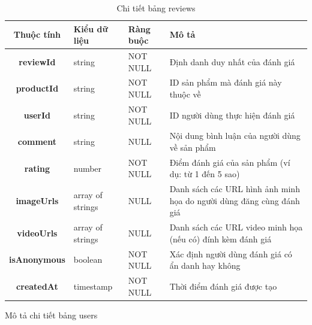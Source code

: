 \documentclass[../DoAn.tex]{subfiles}
\begin{document}
\begin{table}[H]
\centering
\begin{tabular}{|c|l|l|p{7cm}|}
\hline
\textbf{Thuộc tính} & \textbf{Kiểu dữ liệu} & \textbf{Ràng buộc} & \textbf{Mô tả} \\ \hline
\textbf{reviewId} & string & NOT NULL & Định danh duy nhất của đánh giá \\ \hline
\textbf{productId} & string & NOT NULL & ID sản phẩm mà đánh giá này thuộc về \\ \hline
\textbf{userId} & string & NOT NULL & ID người dùng thực hiện đánh giá \\ \hline
\textbf{comment} & string & NULL & Nội dung bình luận của người dùng về sản phẩm \\ \hline
\textbf{rating} & number & NOT NULL & Điểm đánh giá của sản phẩm (ví dụ: từ 1 đến 5 sao) \\ \hline
\textbf{imageUrls} & array of strings & NULL & Danh sách các URL hình ảnh minh họa do người dùng đăng cùng đánh giá \\ \hline
\textbf{videoUrls} & array of strings & NULL & Danh sách các URL video minh họa (nếu có) đính kèm đánh giá \\ \hline
\textbf{isAnonymous} & boolean & NOT NULL & Xác định người dùng đánh giá có ẩn danh hay không \\ \hline
\textbf{createdAt} & timestamp & NOT NULL & Thời điểm đánh giá được tạo \\ \hline
\end{tabular}
\caption{Chi tiết bảng reviews}
\label{tab:reviewsTable}
\end{table}

Mô tả chi tiết bảng users
\end{document}
